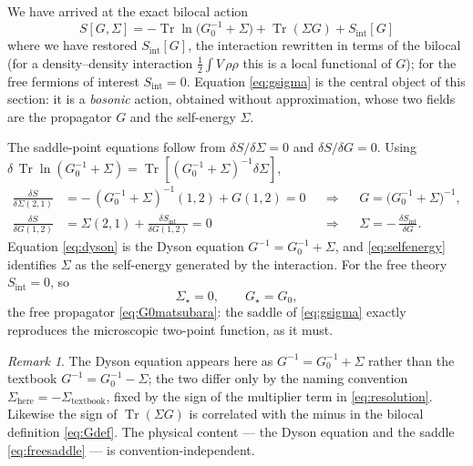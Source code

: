 \documentclass[11pt]{article}
\theoremstyle{remark}
\newtheorem*{remark}{Remark}
\begin{document}
We have arrived at the exact bilocal action
\begin{equation}
\label{eq:gsigma}
\boxed{\;
S[G,\Sigma] = -\operatorname{Tr}\ln\!\big(G_0^{-1}+\Sigma\big) + \operatorname{Tr}(\Sigma G) + S_{\mathrm{int}}[G]\;}
\end{equation}
where we have restored $S_{\mathrm{int}}[G]$, the interaction rewritten in terms
of the bilocal (for a density--density interaction $\tfrac12\!\int V\,\rho\rho$
this is a local functional of $G$); for the free fermions of interest
$S_{\mathrm{int}}=0$. Equation \eqref{eq:gsigma} is the central object of this
section: it is a \emph{bosonic} action, obtained without approximation, whose
two fields are the propagator $G$ and the self-energy $\Sigma$.

The saddle-point equations follow from $\delta S/\delta\Sigma=0$ and
$\delta S/\delta G=0$. Using $\delta\,\operatorname{Tr}\ln(G_0^{-1}+\Sigma)=\operatorname{Tr}[(G_0^{-1}+\Sigma)^{-1}\delta\Sigma]$,
\begin{align}
\frac{\delta S}{\delta \Sigma(2,1)} &= -\,(G_0^{-1}+\Sigma)^{-1}(1,2) + G(1,2) = 0
&&\Longrightarrow&& G = \big(G_0^{-1}+\Sigma\big)^{-1},
\label{eq:dyson}\\[2pt]
\frac{\delta S}{\delta G(1,2)} &= \Sigma(2,1) + \frac{\delta S_{\mathrm{int}}}{\delta G(1,2)} = 0
&&\Longrightarrow&& \Sigma = -\,\frac{\delta S_{\mathrm{int}}}{\delta G}.
\label{eq:selfenergy}
\end{align}
Equation \eqref{eq:dyson} is the Dyson equation $G^{-1}=G_0^{-1}+\Sigma$, and
\eqref{eq:selfenergy} identifies $\Sigma$ as the self-energy generated by the
interaction. For the free theory $S_{\mathrm{int}}=0$, so
\begin{equation}
\label{eq:freesaddle}
\Sigma_\star = 0, \qquad G_\star = G_0,
\end{equation}
the free propagator \eqref{eq:G0matsubara}: the saddle of \eqref{eq:gsigma}
exactly reproduces the microscopic two-point function, as it must.

\begin{remark}
The Dyson equation appears here as $G^{-1}=G_0^{-1}+\Sigma$ rather than the
textbook $G^{-1}=G_0^{-1}-\Sigma$; the two differ only by the naming convention
$\Sigma_{\text{here}}=-\Sigma_{\text{textbook}}$, fixed by the sign of the
multiplier term in \eqref{eq:resolution}. Likewise the sign of $\operatorname{Tr}(\Sigma G)$ is
correlated with the minus in the bilocal definition \eqref{eq:Gdef}. The physical
content --- the Dyson equation and the saddle \eqref{eq:freesaddle} --- is
convention-independent.
\end{remark}
\end{document}
